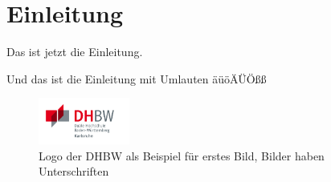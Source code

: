 \chapter{Einleitung}

Das ist jetzt die Einleitung.

Und das ist die Einleitung mit Umlauten äüöÄÜÖßß

\begin{figure}
  \centering
  \includegraphics[width=3cm]{dhbw_logo}
  \caption{Logo der DHBW als Beispiel für erstes Bild, Bilder
    haben Unterschriften}
  \label{bild1}
\end{figure}

\blindtext[2]

